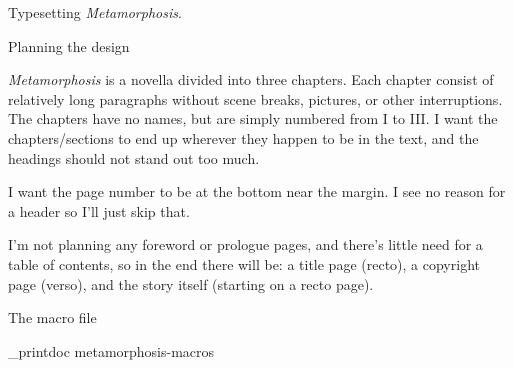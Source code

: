 
\chap Typesetting {\em Metamorphosis}.

\sec Planning the design

{\em Metamorphosis} is a novella divided into three chapters. Each chapter consist of relatively long paragraphs without scene breaks, pictures, or other interruptions.
The chapters have no names, but are simply numbered from I to III. I want the chapters/sections to end up wherever they happen to be in the text, and the headings should not stand out too much.

I want the page number to be at the bottom near the margin. I see no reason for a header so I'll just skip that.

I'm not planning any foreword or prologue pages, and there's little need for a table of contents, so in the end there will be: a title page (recto), a copyright page (verso), and the story itself (starting on a recto page).

\sec The macro file

\_printdoc metamorphosis-macros

\bye

